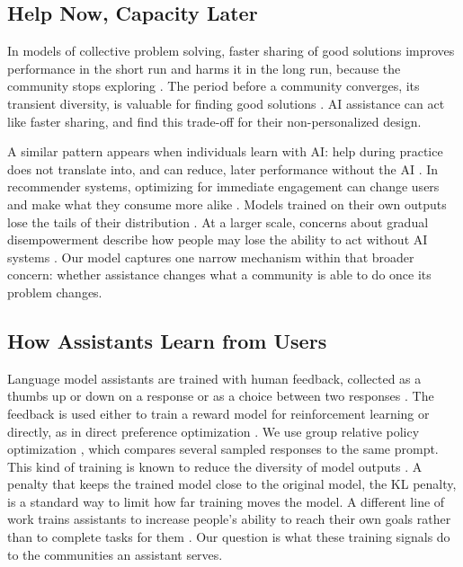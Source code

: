 \documentclass[11pt]{article}
\begin{document}
\subsection{Help Now, Capacity Later}

In models of collective problem solving, faster sharing of good solutions improves performance in the short run and harms it in the long run, because the community stops exploring \citep{lazer2007network}. The period before a community converges, its transient diversity, is valuable for finding good solutions \citep{zollman2010epistemic,wu2023promote}. AI assistance can act like faster sharing, and \citet{fazelpour2026navigating} find this trade-off for their non-personalized design.

A similar pattern appears when individuals learn with AI: help during practice does not translate into, and can reduce, later performance without the AI \citep{bastani2025generative,kumar2025human}. In recommender systems, optimizing for immediate engagement can change users and make what they consume more alike \citep{chaney2018algorithmic,carroll2022estimating}. Models trained on their own outputs lose the tails of their distribution \citep{shumailov2024ai}. At a larger scale, concerns about gradual disempowerment describe how people may lose the ability to act without AI systems \citep{kulveit2025gradual}. Our model captures one narrow mechanism within that broader concern: whether assistance changes what a community is able to do once its problem changes.

\subsection{How Assistants Learn from Users}

Language model assistants are trained with human feedback, collected as a thumbs up or down on a response or as a choice between two responses \citep{christiano2017deep,ouyang2022training}. The feedback is used either to train a reward model for reinforcement learning or directly, as in direct preference optimization \citep{rafailov2023direct}. We use group relative policy optimization \citep[GRPO;][]{shao2024deepseekmath}, which compares several sampled responses to the same prompt. This kind of training is known to reduce the diversity of model outputs \citep{kirk2024understanding}. A penalty that keeps the trained model close to the original model, the KL penalty, is a standard way to limit how far training moves the model. A different line of work trains assistants to increase people's ability to reach their own goals rather than to complete tasks for them \citep{myers2024learning}. Our question is what these training signals do to the communities an assistant serves.
\end{document}
